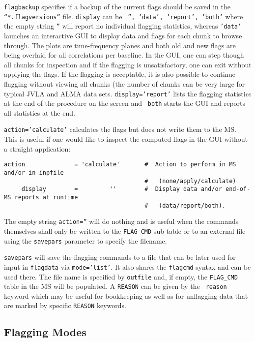 {\tt flagbackup} specifies if a backup of the current flags should be
saved in the {\tt ``*.flagversions''} file. {\tt display} can be {\tt
  '', 'data', 'report', 'both'} where the empty string {\tt ''} will
report no individual flagging statistics, whereas {\tt 'data'}
launches an interactive GUI to display data and flags for each chunk to
browse through. The plots are time-frequency planes and both old and
new flags are being overlaid for all correlations per baseline. In the
GUI, one can step though all chunks for inspection and if the flagging
is unsatisfactory, one can exit without applying the flags. If the
flagging is acceptable, it is also possible to continue flagging
without viewing all chunks (the number of chunks can be very large for
typical JVLA and ALMA data sets. {\tt display='report'} lists the
flagging statistics at the end of the procedure on the screen and {\tt
  both} starts the GUI and reports all statistics at the end.


{\tt action='calculate'} calculates the flags but does not write
them to the MS. This is useful if one would like to inspect the
computed flags in the GUI without a straight application:

\small
\begin{verbatim}
action              = 'calculate'       #  Action to perform in MS and/or in inpfile
                                        #   (none/apply/calculate)
     display        =         ''        #  Display data and/or end-of-MS reports at runtime
                                        #   (data/report/both).
\end{verbatim}
\normalsize

The empty string {\tt action=''} will do nothing and is useful when the
commands themselves shall only be written to the {\tt FLAG\_CMD}
sub-table or to an external file using the {\tt savepars} parameter to
specify the filename.

{\tt savepars} will save the flagging commands to a file that can be
later used for input in {\tt flagdata} via {\tt mode='list'}. It also
shares the {\tt flagcmd} syntax and can be used there. The file name
is specified by {\tt outfile} and, if empty, the {\tt FLAG\_CMD} table
in the MS will be populated.  A {\tt REASON} can be given by the {\tt
  reason} keyword which may be useful for bookkeeping as well as for
unflagging data that are marked by specific {\tt REASON}
keywords.




\subsection{Flagging Modes}
\label{section:edit.tflagdata.mode}

